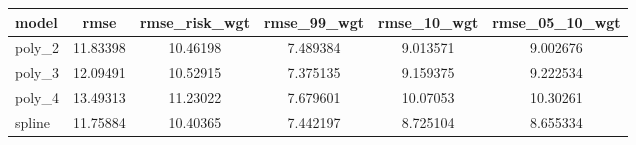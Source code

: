 \documentclass[]{article}
\begin{document}
\begin{tabular}{lccccc} \hline
model & rmse & rmse\_risk\_wgt & rmse\_99\_wgt & rmse\_10\_wgt & rmse\_05\_10\_wgt \\ \hline
poly\_2 & 11.83398 & 10.46198 & 7.489384 & 9.013571 & 9.002676 \\
poly\_3 & 12.09491 & 10.52915 & 7.375135 & 9.159375 & 9.222534 \\
poly\_4 & 13.49313 & 11.23022 & 7.679601 & 10.07053 & 10.30261 \\
 spline & 11.75884 & 10.40365 & 7.442197 & 8.725104 & 8.655334 \\ \hline
\end{tabular}
\end{document}
